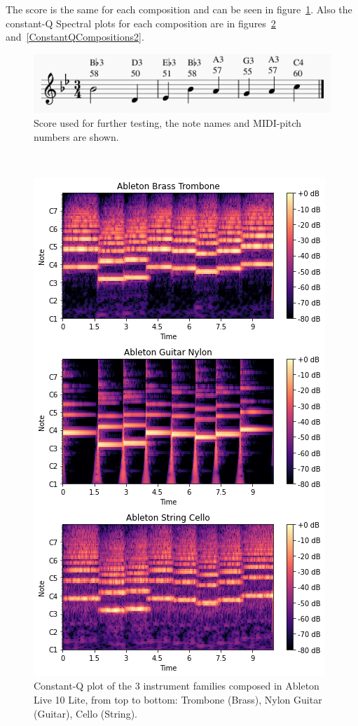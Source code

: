 \documentclass{article}
\begin{document}
The score is the same for each composition and can be seen in figure~\ref{FurtherTestingScore}. Also the constant-Q Spectral plots for each composition are in figures~\ref{ConstantQCompositions} and~\ref{ConstantQCompositions2}.
\begin{figure}[h!]
	\begin{center}
		\includegraphics[scale=0.67]{FurtherTestingScore}
		\caption{Score used for further testing, the note names and MIDI-pitch numbers are shown.}
		\label{FurtherTestingScore}
	\end{center}
\end{figure}\\
\begin{figure}[h!]
	\begin{center}
		\includegraphics[scale=0.6]{download}
		\caption{Constant-Q plot of the 3 instrument families composed in Ableton Live 10 Lite, from top to bottom: Trombone (Brass), Nylon Guitar (Guitar), Cello (String).}
		\label{ConstantQCompositions}
	\end{center}
\end{figure}\\
\end{document}
